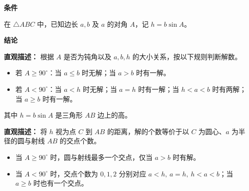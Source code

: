 \begin{statementbox}
	\textbf{\textcolor{CStatement}{条件}}
	\begin{description}[style=nextline, leftmargin=2.8em, labelsep=0.5em, itemsep=0.35em]
		\item[\textbf{\textcolor{CStatement}{条件 1（已知两边及对角）：}}]
			在 $\triangle ABC$ 中，已知边长 $a,b$ 及 $a$ 的对角 $A$，记 $h = b\sin A$。
	\end{description}
	\textbf{\textcolor{CStatement}{结论}}
	\begin{description}[style=nextline, leftmargin=2.8em, labelsep=0.5em, itemsep=0.45em]
		\item[\textbf{\textcolor{CStatement}{结论一（解的个数判据）：}}]
			\textbf{\textcolor{CStatement}{直观描述：}}
			根据 $A$ 是否为钝角以及 $a,b,h$ 的大小关系，按以下规则判断解数。
			\begin{itemize}
			\item 若 $A \geq 90^\circ$：当 $a \leq b$ 时无解；当 $a > b$ 时有一解。
			\item 若 $A < 90^\circ$：当 $a < h$ 时无解；当 $a = h$ 时有一解；当 $h < a < b$ 时有两解；当 $a \geq b$ 时有一解。
		\end{itemize}
			其中 $h = b\sin A$ 是三角形 $AB$ 边上的高。
		\item[\textbf{\textcolor{CStatement}{推广结论（几何作图法）：}}]
			\textbf{\textcolor{CStatement}{直观描述：}}
			将 $h$ 视为点 $C$ 到 $AB$ 的距离，解的个数等价于以 $C$ 为圆心、$a$ 为半径的圆与射线 $AB$ 的交点个数。
			\begin{itemize}
			\item 当 $A \geq 90^\circ$ 时，圆与射线最多一个交点，仅当 $a>b$ 时有解。
			\item 当 $A < 90^\circ$ 时，交点个数为 $0,1,2$ 分别对应 $a<h,\ a=h,\ h<a<b$；当 $a \geq b$ 时也有一个交点。
		\end{itemize}

	\end{description}

\end{statementbox}
